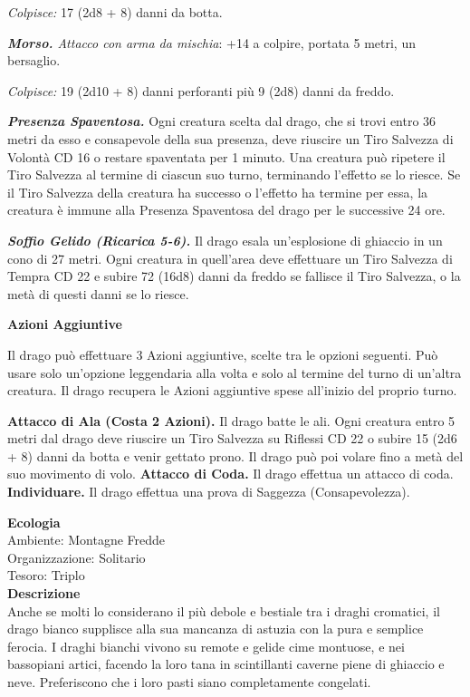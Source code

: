 \begin{multicols}{2}
\emph{Colpisce:} 17 (2d8 + 8) danni da botta.

\emph{\textbf{Morso.} Attacco con arma da mischia}: +14 a colpire, portata 5 metri, un bersaglio.

\emph{Colpisce:} 19 (2d10 + 8) danni perforanti più 9 (2d8) danni da freddo.

\emph{\textbf{Presenza Spaventosa.}} Ogni creatura scelta dal drago, che si trovi entro 36 metri da esso e consapevole della sua presenza, deve riuscire un Tiro Salvezza di Volontà CD 16 o restare spaventata per 1 minuto. Una creatura può ripetere il Tiro Salvezza al termine di ciascun suo turno, terminando l'effetto se lo riesce. Se il Tiro Salvezza della creatura ha successo o l'effetto ha termine per essa, la creatura è immune alla Presenza Spaventosa del drago per le successive 24 ore.

\emph{\textbf{Soffio Gelido (Ricarica 5-6).}} Il drago esala un'esplosione di ghiaccio in un cono di 27 metri. Ogni creatura in quell'area deve effettuare un Tiro Salvezza di Tempra CD 22 e subire 72 (16d8) danni da freddo se fallisce il Tiro Salvezza, o la metà di questi danni se lo riesce.

\textbf{Azioni Aggiuntive}

Il drago può effettuare 3 Azioni aggiuntive, scelte tra le opzioni seguenti. Può usare solo un'opzione leggendaria alla volta e solo al termine del turno di un'altra creatura. Il drago recupera le Azioni aggiuntive spese all'inizio del proprio turno.

\textbf{Attacco di Ala (Costa 2 Azioni).} Il drago batte le ali. Ogni creatura entro 5 metri dal drago deve riuscire un Tiro Salvezza su Riflessi CD 22 o subire 15 (2d6 + 8) danni da botta e venir gettato prono. Il drago può poi volare fino a metà del suo movimento di volo. \textbf{Attacco di Coda.} Il drago effettua un attacco di coda. \textbf{Individuare.} Il drago effettua una prova di Saggezza (Consapevolezza).

\textbf{Ecologia}\\
Ambiente: Montagne Fredde\\
Organizzazione: Solitario\\
Tesoro: Triplo\\
\textbf{Descrizione}\\
Anche se molti lo considerano il più debole e bestiale tra i draghi cromatici, il drago bianco supplisce alla sua mancanza di astuzia con la pura e semplice ferocia. I draghi bianchi vivono su remote e gelide cime montuose, e nei bassopiani artici, facendo la loro tana in scintillanti caverne piene di ghiaccio e neve. Preferiscono che i loro pasti siano completamente congelati.\\


\end{multicols}
